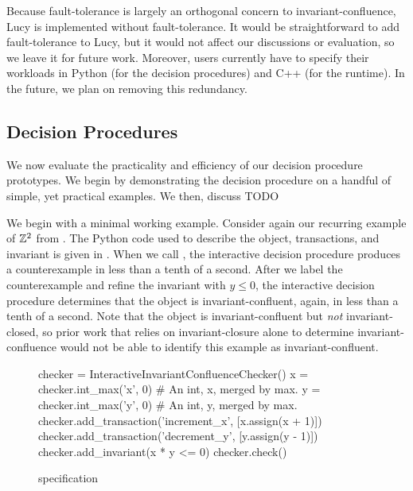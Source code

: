 Because fault-tolerance is largely an orthogonal concern to
invariant-confluence, Lucy is implemented without fault-tolerance. It would be
straightforward to add fault-tolerance to Lucy, but it would not affect our
discussions or evaluation, so we leave it for future work. Moreover, users
currently have to specify their workloads in Python (for the decision
procedures) and C++ (for the runtime). In the future, we plan on removing this
redundancy.

\subsection{Decision Procedures}
We now evaluate the practicality and efficiency of our decision procedure
prototypes. We begin by demonstrating the decision procedure on a handful of
simple, yet practical examples. We then, discuss TODO

\example[$\ints^2$]
We begin with a minimal working example. Consider again our recurring example
of $\ints^2$ from . The Python code used to describe the object,
transactions, and invariant is given in . When we call
, the interactive decision procedure produces
a counterexample in less than a tenth of a second.  After we label the
counterexample and refine the invariant with $y \leq 0$, the interactive
decision procedure determines that the object is invariant-confluent, again, in
less than a tenth of a second. Note that the object is invariant-confluent but
\emph{not} invariant-closed, so prior work that relies on invariant-closure
alone to determine invariant-confluence would not be able to identify this
example as invariant-confluent.

\begin{figure}[ht]
  \begin{Python}[gobble=4]
    checker = InteractiveInvariantConfluenceChecker()
    x = checker.int_max('x', 0) # An int, x, merged by max.
    y = checker.int_max('y', 0) # An int, y, merged by max.
    checker.add_transaction('increment_x', [x.assign(x + 1)])
    checker.add_transaction('decrement_y', [y.assign(y - 1)])
    checker.add_invariant(x * y <= 0)
    checker.check()
  \end{Python}
  \caption{ specification}
\end{figure}

